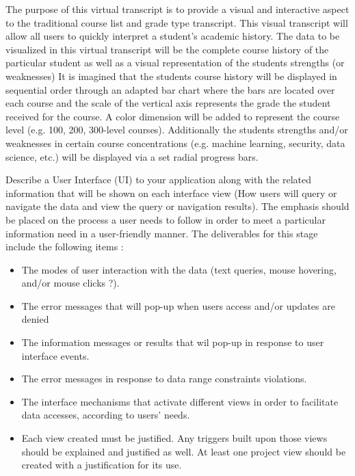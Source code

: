 The purpose of this virtual transcript is to provide a visual and interactive aspect to the traditional course list and grade type transcript. This visual transcript will allow all users to quickly interpret a student's academic history. The data to be visualized in this virtual transcript will be the complete course history of the particular student as well as a visual representation of the students strengths (or weaknesses) It is imagined that the students course history will be displayed in sequential order through an adapted bar chart where the bars are located over each course and the scale of the vertical axis represents the grade the student received for the course. A color dimension will be added to represent the course level (e.g. 100, 200, 300-level courses). Additionally the students strengths and/or weaknesses in certain course concentrations (e.g. machine learning, security, data science, etc.) will be displayed via a set radial progress bars.


\textnormal{
Describe a User Interface (UI) to your application along with the related information that will be shown on each interface view (How users will query or navigate the data and view the query or navigation results). The emphasis should be placed on the process a user needs to follow in order to meet a particular information need in a user-friendly manner.
The deliverables for this stage include the following items :
}
\begin{itemize} 
\item{The modes of user interaction with the data (text queries, mouse hovering, and/or mouse clicks ?).} 
\item{The error messages that will pop-up when users access and/or updates are denied   }
\item{The information messages or results that wil pop-up in response to user interface events. }
	
\item{ The error messages in response to data range constraints violations.}
	
\item{ The interface mechanisms that activate different views in order to facilitate data accesses, according to users'  needs. }
	
\item{Each view created must be justified. Any triggers built upon those views should be explained and justified as well. At least one project view should be created with a justification for its use. }	
\end{itemize}

